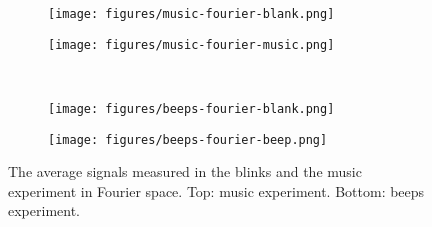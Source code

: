\begin{figure}[h]
    \centering
    \begin{subfigure}{0.5\linewidth}
        \centering
        \captionsetup{width = 0.9\linewidth}
        \texttt{[image: figures/music-fourier-blank.png]}
    \end{subfigure}%
    \begin{subfigure}{0.5\linewidth}
        \centering
        \captionsetup{width = 0.9\linewidth}
        \texttt{[image: figures/music-fourier-music.png]}
    \end{subfigure}%
    \\
    \begin{subfigure}{0.5\linewidth}
        \centering
        \captionsetup{width = 0.9\linewidth}
        \texttt{[image: figures/beeps-fourier-blank.png]}
    \end{subfigure}%
    \begin{subfigure}{0.5\linewidth}
        \centering
        \captionsetup{width = 0.9\linewidth}
        \texttt{[image: figures/beeps-fourier-beep.png]}
    \end{subfigure}%
    \caption{The average signals measured in the blinks and the music experiment in Fourier space. Top: music experiment. Bottom: beeps experiment.}
    \label{fig:sound-fourier}
\end{figure}